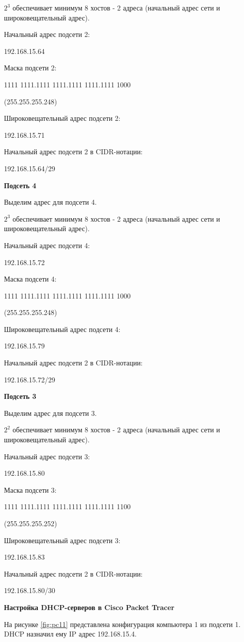 \documentclass[a4paper,14pt]{article}
\begin{document}
$2^3$ обеспечивает минимум 8 хостов - 2 адреса (начальный адрес сети и широковещательный адрес).


Начальный адрес подсети 2: 

192.168.15.64

Маска подсети 2:

1111 1111.1111 1111.1111 1111.1111 1000

(255.255.255.248)

Широковещательный адрес подсети 2:

192.168.15.71

Начальный адрес подсети 2 в CIDR-нотации:

192.168.15.64/29

\textbf{Подсеть 4}

Выделим адрес для подсети 4.

$2^3$ обеспечивает минимум 8 хостов - 2 адреса (начальный адрес сети и широковещательный адрес).


Начальный адрес подсети 4: 

192.168.15.72

Маска подсети 4:

1111 1111.1111 1111.1111 1111.1111 1000

(255.255.255.248)

Широковещательный адрес подсети 4:

192.168.15.79

Начальный адрес подсети 2 в CIDR-нотации:

192.168.15.72/29

\textbf{Подсеть 3}

Выделим адрес для подсети 3.

$2^2$ обеспечивает минимум 8 хостов - 2 адреса (начальный адрес сети и широковещательный адрес).


Начальный адрес подсети 3: 

192.168.15.80

Маска подсети 3:

1111 1111.1111 1111.1111 1111.1111 1100

(255.255.255.252)

Широковещательный адрес подсети 3:

192.168.15.83

Начальный адрес подсети 2 в CIDR-нотации:

192.168.15.80/30

\textbf{Настройка DHCP-серверов в Cisco Packet Tracer}

На рисунке \ref{fig:pc11} представлена конфигурация компьютера 1 из подсети 1. DHCP назначил ему IP адрес 192.168.15.4.
\end{document}
